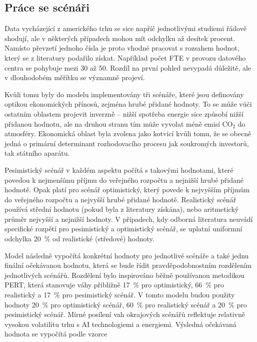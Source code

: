 \subsection{Práce se scénáři}
\label{subsec:model_scenare}

Data vycházející z amerického trhu se sice napříč jednotlivými studiemi řádově shodují, ale v některých případech mohou mít odchylku až desítek procent. Namísto převzetí jednoho čísla je proto vhodné pracovat s rozsahem hodnot, který se z literatury podařilo získat. Například počet FTE v provozu datového centra se pohybuje mezi 30 až 50. Rozdíl na první pohled nevypadá důležitě, ale v dlouhodobém měřítku se významně projeví.

Kvůli tomu byly do modelu implementovány tři scénáře, které jsou definovány optikou ekonomických přínosů, zejména hrubé přidané hodnoty. To se může vůči ostatním oblastem projevit inverzně -- nižší spotřeba energie sice způsobí nižší přidanou hodnotu, ale na druhou stranu tím může vyvolat méně emisí CO$_2$ do atmosféry. Ekonomická oblast byla zvolena jako kotvicí kvůli tomu, že se obecně jedná o primární determinant rozhodovacího procesu jak soukromých investorů, tak státního aparátu.

Pesimistický scénář v každém aspektu počítá s takovými hodnotami, které povedou k nejmenšímu příjmu do veřejného rozpočtu a nejnižší hrubé přidané hodnotě. Opak platí pro scénář optimistický, který povede k nejvyšším příjmům do veřejného rozpočtu a nejvyšší hrubé přidané hodnotě. Realistický scénář používá střední hodnotu (pokud byla z literatury získána), nebo aritmetický průměr nejvyšší a nejnižší hodnoty. V případech, kdy odborná literatura neuvádí specifické rozpětí pro pesimistický a optimistický scénář, se uplatní uniformní odchylka 20~\% od realistické (středové) hodnoty.

Model následně vypočítá konkrétní hodnoty pro jednotlivé scénáře a také jednu finální očekávanou hodnotu, která se bude řídit pravděpodobnostním rozdělením jednotlivých scénářů. Rozdělení bylo inspirováno běžně používanou metodikou PERT, která stanovuje váhy přibližně 17~\% pro optimistický, 66~\% pro realistický a 17~\% pro pesimistický scénář. V tomto modelu budou použity hodnoty 20~\% pro optimistický scénář, 60~\% pro realistický scénář a 20~\% pro pesimistický scénář. Mírné posílení vah okrajových scénářů reflektuje relativně vysokou volatilitu trhu s AI technologiemi a energiemi. Výsledná očekávaná hodnota se vypočítá podle vzorce

